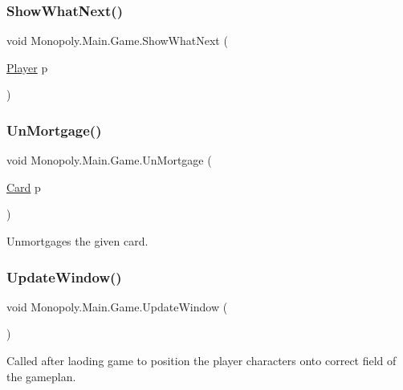 \subsubsection{\texorpdfstring{Show\+What\+Next()}{ShowWhatNext()}}
{\footnotesize\ttfamily void Monopoly.\+Main.\+Game.\+Show\+What\+Next (\begin{DoxyParamCaption}\item[{\mbox{\hyperlink{class_monopoly_1_1_players_1_1_player}{Player}}}]{p }\end{DoxyParamCaption})\hspace{0.3cm}{\ttfamily [inline]}}

\mbox{\label{class_monopoly_1_1_main_1_1_game_a91033504683bc8e684e9c938181e955b}} 
\subsubsection{\texorpdfstring{Un\+Mortgage()}{UnMortgage()}}
{\footnotesize\ttfamily void Monopoly.\+Main.\+Game.\+Un\+Mortgage (\begin{DoxyParamCaption}\item[{\mbox{\hyperlink{class_monopoly_1_1_cards_1_1_card}{Card}}}]{p }\end{DoxyParamCaption})\hspace{0.3cm}{\ttfamily [inline]}}

Unmortgages the given card. \mbox{\label{class_monopoly_1_1_main_1_1_game_a3f982631780b7f01e57529c35703b528}} 
\subsubsection{\texorpdfstring{Update\+Window()}{UpdateWindow()}}
{\footnotesize\ttfamily void Monopoly.\+Main.\+Game.\+Update\+Window (\begin{DoxyParamCaption}{ }\end{DoxyParamCaption})\hspace{0.3cm}{\ttfamily [inline]}}

Called after laoding game to position the player characters onto correct field of the gameplan. 

